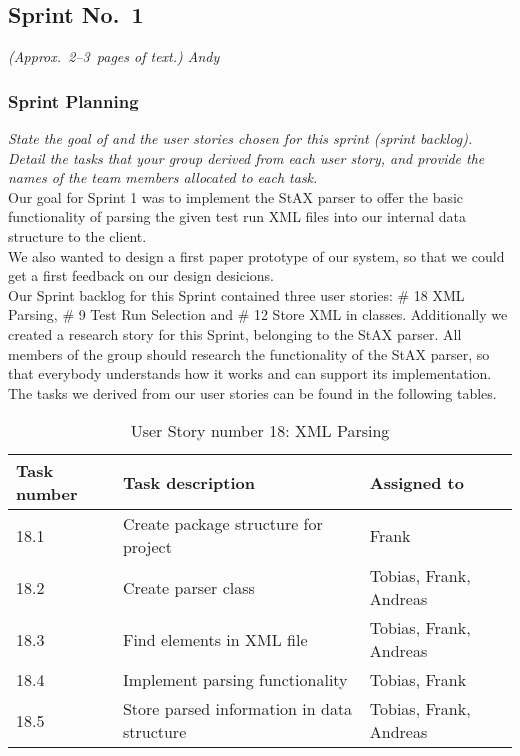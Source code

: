 
\subsection{Sprint No.~1}

\emph{(Approx.~2--3~pages of text.) Andy}

\subsubsection*{Sprint Planning}

\emph{State the goal of and the user stories chosen for this sprint (sprint backlog). Detail the tasks that your group derived from each user story, and provide the names of the team members allocated to each task.} \\

Our goal for Sprint 1 was to implement the StAX parser to offer the basic functionality of parsing the given test run XML files into our internal data structure to the client. \\ 
We also wanted to design a first paper prototype of our system, so that we could get a first feedback on our design desicions. \\ 
Our Sprint backlog for this Sprint contained three user stories: \# 18 XML Parsing, \# 9 Test Run Selection and \# 12 Store XML in classes. Additionally we created a research story for this Sprint, belonging to the StAX parser. All members of the group should research the functionality of the StAX parser, so that everybody understands how it works and can support its implementation. \\ 
The tasks we derived from our user stories can be found in the following tables. \\ 

\begin{table}[h]
  \caption{User Story number 18: XML Parsing}
  \label{US_Parsing}
  \centering
  \begin{tabular}{p{1.5cm}|p{9cm}|p{3cm}|}
  	Task number & Task description & Assigned to \\ 
  	\hline
  	\hline
  	18.1 & Create package structure for project & Frank \\
  	\hline
  	18.2 & Create parser class & Tobias, Frank, Andreas \\ 
  	\hline
  	18.3 & Find elements in XML file & Tobias, Frank, Andreas \\ 
  	\hline
  	18.4 & Implement parsing functionality & Tobias, Frank \\ 
  	\hline
  	18.5 & Store parsed information in data structure & Tobias, Frank, Andreas \\ 
  	\hline
  \end{tabular}
\end{table} 

